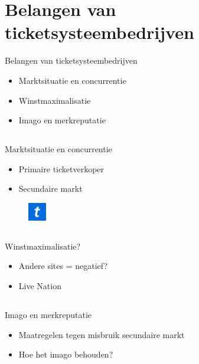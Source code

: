 \documentclass{beamer}
\begin{document}
\section[Bedrijf]{Belangen van ticketsysteembedrijven}
\begin{frame}{Belangen van ticketsysteembedrijven}
    \begin{itemize}
        \item Marktsituatie en concurrentie
        \item Winstmaximalisatie
        \item Imago en merkreputatie
    \end{itemize}
\end{frame}

    \subsection{}
    \begin{frame}{Marktsituatie en concurrentie}
        \begin{itemize}
            \item Primaire ticketverkoper
            \item Secundaire markt
        \end{itemize}
        \begin{figure}
            \includegraphics[width=30px,height=30px,keepaspectratio]{ticketmaster-logo}            
        \end{figure}
    \end{frame}
    
    \subsection{}
    \begin{frame}{Winstmaximalisatie?}
        \begin{itemize}
            \item Andere sites = negatief?
            \item Live Nation
        \end{itemize}
    \end{frame}

    \subsection{}
    \begin{frame}{Imago en merkreputatie}
        \begin{itemize}
            \item Maatregelen tegen misbruik secundaire markt
            \item Hoe het imago behouden?
        \end{itemize}
    \end{frame}
\end{document}
